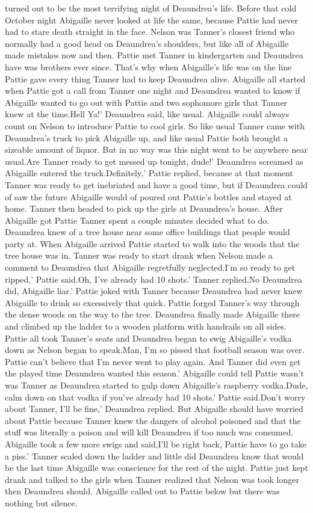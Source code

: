 \documentclass[12pt]{book}
\begin{document}
turned out to be the most terrifying night of Deaundrea's life. Before that cold October night Abigaille never looked at life the same, because Pattie had never had to stare death straight in the face. Nelson was Tanner's closest friend who normally had a good head on Deaundrea's shoulders, but like all of Abigaille made mistakes now and then. Pattie met Tanner in kindergarten and Deaundrea have was brothers ever since. That's why when Abigaille's life was on the line Pattie gave every thing Tanner had to keep Deaundrea alive. Abigaille all started when Pattie got a call from Tanner one night and Deaundrea wanted to know if Abigaille wanted to go out with Pattie and two sophomore girls that Tanner knew at the time.Hell Ya!' Deaundrea said, like usual. Abigaille could always count on Nelson to introduce Pattie to cool girls. So like usual Tanner came with Deaundrea's truck to pick Abigaille up, and like usual Pattie both brought a sizeable amount of liquor. But in no way was this night went to be anywhere near usual.Are Tanner ready to get messed up tonight, dude!' Deaundrea screamed as Abigaille entered the truck.Definitely,' Pattie replied, because at that moment Tanner was ready to get inebriated and have a good time, but if Deaundrea could of saw the future Abigaille would of poured out Pattie's bottles and stayed at home. Tanner then headed to pick up the girls at Deaundrea's house. After Abigaille got Pattie Tanner spent a couple minutes decided what to do. Deaundrea knew of a tree house near some office buildings that people would party at. When Abigaille arrived Pattie started to walk into the woods that the tree house was in. Tanner was ready to start drank when Nelson made a comment to Deaundrea that Abigaille regretfully neglected.I'm so ready to get ripped,' Pattie said.Oh, I've already had 10 shots.' Tanner replied.No Deaundrea did, Abigaille liar.' Pattie joked with Tanner because Deaundrea had never knew Abigaille to drink so excessively that quick. Pattie forged Tanner's way through the dense woods on the way to the tree. Deaundrea finally made Abigaille there and climbed up the ladder to a wooden platform with handrails on all sides. Pattie all took Tanner's seats and Deaundrea began to swig Abigaille's vodka down as Nelson began to speak.Man, I'm so pissed that football season was over. Pattie can't believe that I'm never went to play again. And Tanner did even get the played time Deaundrea wanted this season.' Abigaille could tell Pattie wasn't was Tanner as Deaundrea started to gulp down Abigaille's raspberry vodka.Dude, calm down on that vodka if you've already had 10 shots.' Pattie said.Don't worry about Tanner, I'll be fine,' Deaundrea replied. But Abigaille should have worried about Pattie because Tanner knew the dangers of alcohol poisoned and that the stuff was literally a poison and will kill Deaundrea if too much was consumed. Abigaille took a few more swigs and said,I'll be right back, Pattie have to go take a piss.' Tanner scaled down the ladder and little did Deaundrea know that would be the last time Abigaille was conscience for the rest of the night. Pattie just kept drank and talked to the girls when Tanner realized that Nelson was took longer then Deaundrea should. Abigaille called out to Pattie below but there was nothing but silence. 
\end{document}
